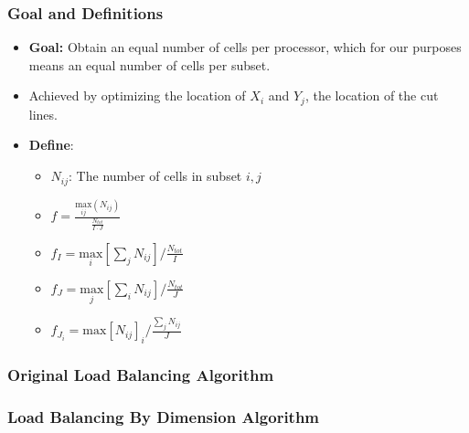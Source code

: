 \documentclass[compress]{beamer}
\begin{document}
\begin{frame}[t]\frametitle{ Goal and Definitions}
	\begin{block}{}
	
		\begin{itemize}
			\item \textbf{Goal:} Obtain an equal number of cells per processor, which for our purposes means an equal number of cells per subset.
			\item Achieved by optimizing the location of $X_i$ and $Y_j$, the location of the cut lines.
			\item \textbf{Define}:
			\begin{itemize}
			\item $N_{ij}$: The number of cells  in subset ${i,j}$
			\item $f =\frac{\underset{ij}{\text{max}}(N_{ij})}{\frac{N_{tot}}{I\cdot J}}$
			\item $f_I = \underset{i}{\text{max}}[\sum_{j} N_{ij}]/\frac{N_{tot}}{I}$
			\item $f_J = \underset{j}{\text{max}}[\sum_{i} N_{ij}]/\frac{N_{tot}}{J}$
			\item $f_{J_i} = \text{max}[N_{ij}]_i/\frac{\sum_{j}N_{ij}}{J}$
			\end{itemize}
		\end{itemize}
	\end{block}
\end{frame}

\begin{frame}[t]\frametitle{Original Load Balancing Algorithm}
\vspace{-0.5 cm}
\begin{block}{}

\end{block}
\end{frame}

\begin{frame}[t]\frametitle{Load Balancing By Dimension Algorithm}
\vspace{-0.5 cm}
\begin{block}{}

\end{block}
\end{frame}
\end{document}
